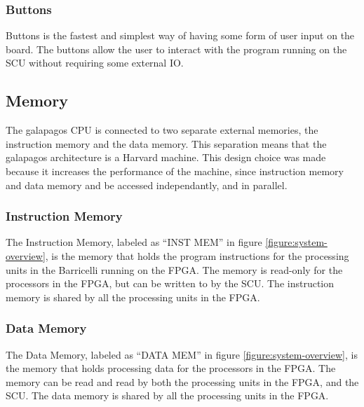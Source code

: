 \subsubsection{Buttons}

Buttons is the fastest and simplest way of having some form of user input on the board.
The buttons allow the user to interact with the program running on the SCU without requiring some external IO.

\subsection{Memory}

The \Gls{galapagos} CPU is connected to two separate external memories, the instruction memory and the data memory.
This separation means that the \Gls{galapagos} architecture is a Harvard machine.
This design choice was made because it increases the performance of the machine, since instruction memory and data memory and be accessed independantly, and in parallel. 

\subsubsection{Instruction Memory}

The Instruction Memory, labeled as ``INST MEM'' in figure \vref{figure:system-overview}, is the memory that holds the program instructions for the processing units in the Barricelli running on the FPGA.
The memory is read-only for the processors in the FPGA, but can be written to by the SCU.
The instruction memory is shared by all the processing units in the FPGA.

\subsubsection{Data Memory}

The Data Memory, labeled as ``DATA MEM'' in figure \vref{figure:system-overview}, is the memory that holds processing data for the processors in the FPGA.
The memory can be read and read by both the processing units in the FPGA, and the SCU.
The data memory is shared by all the processing units in the FPGA.
